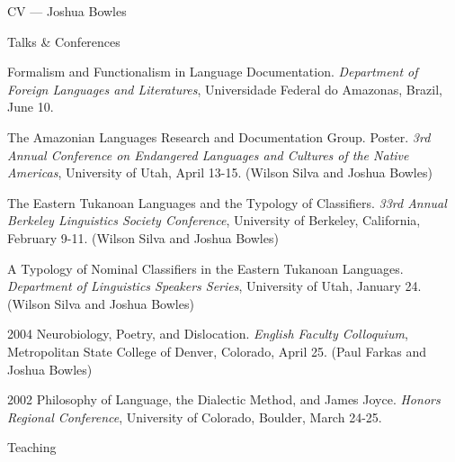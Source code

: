 \begin{cv}{CV --- Joshua Bowles}
\begin{cvlist}{Talks \& Conferences}
\item Formalism and Functionalism in Language Documentation. \emph{Department of
Foreign Languages and Literatures}, Universidade Federal do Amazonas, Brazil,
June 10.

\item The Amazonian Languages Research and Documentation Group. Poster. \emph{3rd
Annual Conference on Endangered Languages and Cultures of the Native
Americas}, University of Utah, April 13-15.
(Wilson Silva and Joshua Bowles)

\item The Eastern Tukanoan Languages and the Typology of Classifiers. \emph{33rd Annual Berkeley
Linguistics Society Conference}, University of Berkeley, California,
February 9-11. (Wilson Silva and Joshua Bowles)

\item A Typology of Nominal Classifiers in the Eastern Tukanoan Languages.
\emph{Department of Linguistics Speakers Series}, University of Utah, January 24. (Wilson Silva and
Joshua Bowles)
\item[2004] Neurobiology, Poetry, and Dislocation. \emph{English Faculty Colloquium}, Metropolitan
State College of Denver, Colorado, April 25. (Paul Farkas and Joshua Bowles)
\item[2002] Philosophy of Language, the Dialectic Method, and James Joyce. \emph{Honors Regional
Conference}, University of Colorado, Boulder, March 24-25.
\end{cvlist}

\begin{cvlist}{Teaching}


\end{cvlist}
\end{cv}

